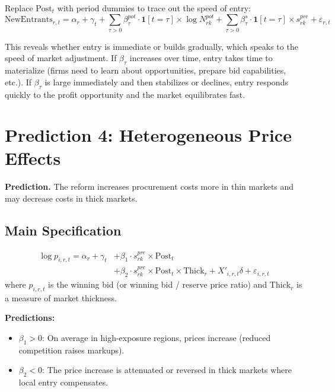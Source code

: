 \documentclass[12pt]{article}
\newcommand{\ind}{\mathbf{1}}
\begin{document}
Replace $\text{Post}_t$ with period dummies to trace out the speed of entry:
\begin{equation}\label{eq:entry_dynamics}
    \text{NewEntrants}_{r,t} = \alpha_r + \gamma_t + \sum_{\tau > 0} \beta_\tau^{pot} \cdot \ind[t=\tau] \times \log N_{rk}^{pot} + \sum_{\tau > 0} \beta_\tau^{s} \cdot \ind[t=\tau] \times s_{rk}^{pre} + \varepsilon_{r,t}
\end{equation}

This reveals whether entry is immediate or builds gradually, which speaks to the speed of market adjustment. If $\beta_\tau$ increases over time, entry takes time to materialize (firms need to learn about opportunities, prepare bid capabilities, etc.). If $\beta_\tau$ is large immediately and then stabilizes or declines, entry responds quickly to the profit opportunity and the market equilibrates fast.

\section{Prediction 4: Heterogeneous Price Effects}

\textbf{Prediction.} The reform increases procurement costs more in thin markets and may decrease costs in thick markets.

\subsection{Main Specification}

\begin{equation}\label{eq:price_main}
\begin{split}
    \log p_{i,r,t} = \alpha_r + \gamma_t &+ \beta_1 \cdot s_{rk}^{pre} \times \text{Post}_t \\
    &+ \beta_2 \cdot s_{rk}^{pre} \times \text{Post}_t \times \text{Thick}_r + X'_{i,r,t}\delta + \varepsilon_{i,r,t}
\end{split}
\end{equation}
where $p_{i,r,t}$ is the winning bid (or winning bid / reserve price ratio) and $\text{Thick}_r$ is a measure of market thickness.

\textbf{Predictions:}
\begin{itemize}[itemsep=2pt]
    \item $\beta_1 > 0$: On average in high-exposure regions, prices increase (reduced competition raises markups).
    \item $\beta_2 < 0$: The price increase is attenuated or reversed in thick markets where local entry compensates.
\end{itemize}
\end{document}
